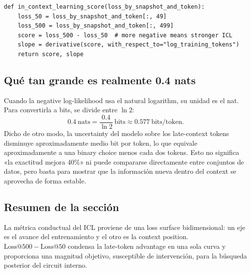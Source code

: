 \begin{lstlisting}[caption={Cálculo del ICL score y del phase-change diagnostic a partir de la per-token loss.}]
def in_context_learning_score(loss_by_snapshot_and_token):
    loss_50 = loss_by_snapshot_and_token[:, 49]
    loss_500 = loss_by_snapshot_and_token[:, 499]
    score = loss_500 - loss_50  # more negative means stronger ICL
    slope = derivative(score, with_respect_to="log_training_tokens")
    return score, slope
\end{lstlisting}

\subsection{Qué tan grande es realmente 0.4 nats}

Cuando la negative log-likelihood usa el natural logarithm, su unidad es el nat. Para convertirla a bits, se divide entre $\ln 2$:
\[
0.4\ \mathrm{nats}
=\frac{0.4}{\ln 2}\ \mathrm{bits}
\approx 0.577\ \mathrm{bits/token}.
\]
Dicho de otro modo, la uncertainty del modelo sobre los late-context tokens disminuye aproximadamente medio bit por token, lo que equivale aproximadamente a una binary choice menos cada dos tokens. Esto no significa «la exactitud mejora 40\%» ni puede compararse directamente entre conjuntos de datos, pero basta para mostrar que la información nueva dentro del context se aprovecha de forma estable.



\subsection{Resumen de la sección}

La métrica conductual del ICL proviene de una loss surface bidimensional: un eje es el avance del entrenamiento y el otro es la context position. $\mathrm{Loss@500}-\mathrm{Loss@50}$ condensa la late-token advantage en una sola curva y proporciona una magnitud objetivo, susceptible de intervención, para la búsqueda posterior del circuit interno.
